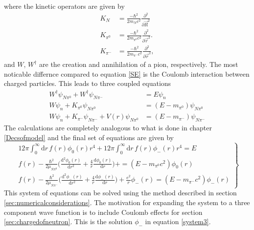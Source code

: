where the kinetic operators are given by
\begin{align} \label{multiNNeutron}
	K_N &= \frac{-\hbar^2}{2 m_N c^2} \frac{\partial^2}{\partial \vec{R}^2} \\
	K_{\pi^0} &= \frac{-\hbar^2}{2 m_{\pi^0} c^2} \frac{\partial^2}{\partial \vec{r}^2} \label{kinpiNeutron1}. \\
	K_{\pi^-}&= \frac{-\hbar^2}{2 m_{\pi^{-}} c^2} \frac{\partial^2}{\partial \vec{r}^2} \label{kinpiNeutron2},
\end{align} 
and $W$, $W^\dagger$ are the creation and annihilation of a pion, respectively. The most noticable differnce compared to equation \eqref{SE} is the Coulomb interaction between charged particles. This leads to three coupled equations 
\begin{align}
	W^\dagger \psi_{N\pi^0}+W^\dagger \psi_{N\pi^-} & = E\psi_n \\    
	W\psi_n + K_{\pi^0}\psi_{N\pi^0} &=(E-m_{\pi^0})\psi_{N\pi^0} \\
	W\psi_n + K_{\pi^-}\psi_{N\pi^-}+V(r)\psi_{N\pi^0} &=(E-m_{\pi^-})\psi_{N\pi^-}
\end{align}
The calculations are completely analogous to what is done in chapter \ref{Decsofmodel} and the final set of equations are given by
\begin{equation} \label{system3}
	\left.
	\begin{array}{ll}
		12\pi \int_0^\infty  \text{d}r \, f(r) \phi_0(r) r^4 + 12\pi \int_0^\infty  \text{d}r \, f(r) \phi_-(r) r^4 = E \\
		f(r) -\frac{\hbar^2}{2\mu_{N{\pi^0}}}\Big(\frac{\text{d}^2 \phi_0(r)}{\text{d}r^2}+\frac{4}{r}\frac{\text{d}\phi_0(r)}{\text{d}r}\Big)+ = (E-m_{\pi^0} c^2)\phi_0(r) \\
		f(r) -\frac{\hbar^2}{2\mu_{N\pi^{-}}}\Big(\frac{\text{d}^2 \phi_{-}(r)}{\text{d}r^2}+\frac{4}{r}\frac{\text{d}\phi_{-}(r)}{\text{d}r}\Big) +\frac{e^2}{r}\phi_{-}(r)= (E-m_{\pi^-} c^2 )\phi_-(r)
	\end{array}
	\right \} 
\end{equation}
This system of equations can be solved using the method described in section \ref{sec:numericalconsiderations}. The motivation for expanding the system to a three component wave function is to include Coulomb effects for section \ref{sec:chargedofneutron}. This is the solution $\phi_{-}$ in equation \eqref{system3}.


